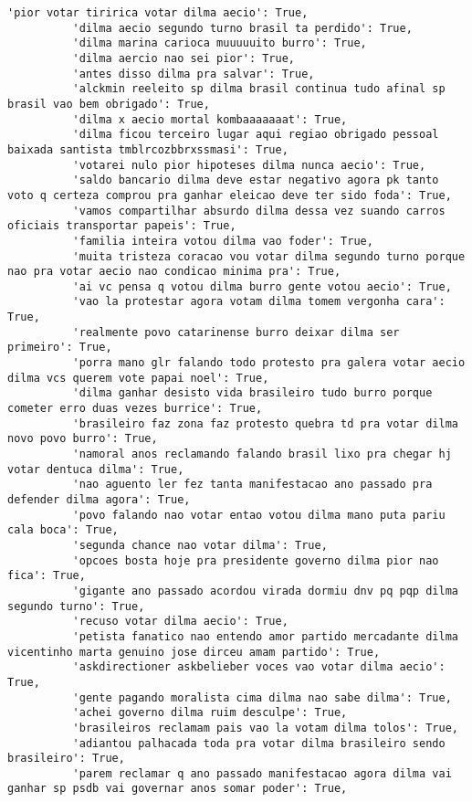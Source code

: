 \documentclass[11pt]{article}
\begin{document}
\begin{Verbatim}[commandchars=\\\{\}]
          'pior votar tiririca votar dilma aecio': True,
          'dilma aecio segundo turno brasil ta perdido': True,
          'dilma marina carioca muuuuuito burro': True,
          'dilma aercio nao sei pior': True,
          'antes disso dilma pra salvar': True,
          'alckmin reeleito sp dilma brasil continua tudo afinal sp brasil vao bem obrigado': True,
          'dilma x aecio mortal kombaaaaaaat': True,
          'dilma ficou terceiro lugar aqui regiao obrigado pessoal baixada santista tmblrcozbbrxssmasi': True,
          'votarei nulo pior hipoteses dilma nunca aecio': True,
          'saldo bancario dilma deve estar negativo agora pk tanto voto q certeza comprou pra ganhar eleicao deve ter sido foda': True,
          'vamos compartilhar absurdo dilma dessa vez suando carros oficiais transportar papeis': True,
          'familia inteira votou dilma vao foder': True,
          'muita tristeza coracao vou votar dilma segundo turno porque nao pra votar aecio nao condicao minima pra': True,
          'ai vc pensa q votou dilma burro gente votou aecio': True,
          'vao la protestar agora votam dilma tomem vergonha cara': True,
          'realmente povo catarinense burro deixar dilma ser primeiro': True,
          'porra mano glr falando todo protesto pra galera votar aecio dilma vcs querem vote papai noel': True,
          'dilma ganhar desisto vida brasileiro tudo burro porque cometer erro duas vezes burrice': True,
          'brasileiro faz zona faz protesto quebra td pra votar dilma novo povo burro': True,
          'namoral anos reclamando falando brasil lixo pra chegar hj votar dentuca dilma': True,
          'nao aguento ler fez tanta manifestacao ano passado pra defender dilma agora': True,
          'povo falando nao votar entao votou dilma mano puta pariu cala boca': True,
          'segunda chance nao votar dilma': True,
          'opcoes bosta hoje pra presidente governo dilma pior nao fica': True,
          'gigante ano passado acordou virada dormiu dnv pq pqp dilma segundo turno': True,
          'recuso votar dilma aecio': True,
          'petista fanatico nao entendo amor partido mercadante dilma vicentinho marta genuino jose dirceu amam partido': True,
          'askdirectioner askbelieber voces vao votar dilma aecio': True,
          'gente pagando moralista cima dilma nao sabe dilma': True,
          'achei governo dilma ruim desculpe': True,
          'brasileiros reclamam pais vao la votam dilma tolos': True,
          'adiantou palhacada toda pra votar dilma brasileiro sendo brasileiro': True,
          'parem reclamar q ano passado manifestacao agora dilma vai ganhar sp psdb vai governar anos somar poder': True,

\end{Verbatim}
\end{document}
